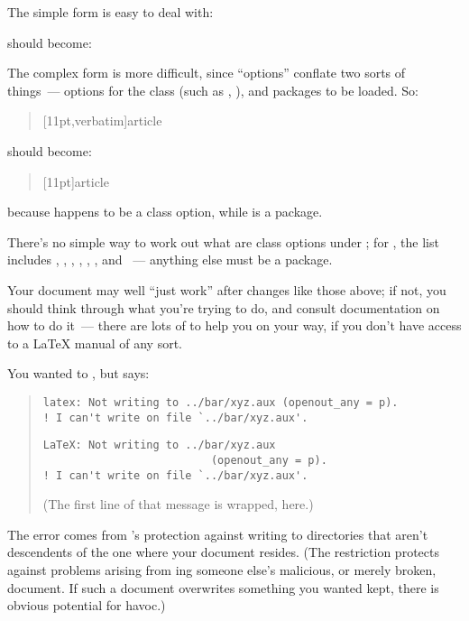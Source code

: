 {The simple form is easy to deal with:
\begin{quote}
\end{quote}
should become:
\begin{quote}
\end{quote}
The complex form is more difficult, since \LaTeXo{} ``options''
conflate two sorts of things~--- options for the class (such as
\pkgoption{11pt}, ), and packages to be loaded.
So:
\begin{quote}
  [11pt,verbatim]{article}
\end{quote}
should become:
\begin{quote}
  [11pt]{article}\\
\end{quote}
because \pkgoption{11pt} happens to be a class option, while
 is a package.

There's no simple way to work out what are class options under
\LaTeXo{}; for , the list includes \pkgoption{10pt},
\pkgoption{11pt}, \pkgoption{12pt}, ,
, ,  and
~--- anything else must be a package.

Your document may well ``just work'' after changes like those above;
if not, you should think through what you're trying to do, and consult
documentation on how to do it~--- there are lots of %
 to help you on your way, if you
don't have access to a \LaTeX{} manual of any sort.


You wanted to , but \latex{} says:
\begin{quote}
\begin{wideversion}
\begin{verbatim}
latex: Not writing to ../bar/xyz.aux (openout_any = p).
! I can't write on file `../bar/xyz.aux'.
\end{verbatim}
\end{wideversion}
\begin{narrowversion}
\begin{verbatim}
LaTeX: Not writing to ../bar/xyz.aux
                          (openout_any = p).
! I can't write on file `../bar/xyz.aux'.
\end{verbatim}
(The first line of that message is wrapped, here.)
\end{narrowversion}
\end{quote}
The error comes from \tex{}'s protection against writing to
directories that aren't descendents of the one where your document
resides.  (The restriction protects against problems arising from
\latex{}ing someone else's malicious, or merely broken, document.  If
such a document overwrites something you wanted kept, there is obvious
potential for havoc.)

}
